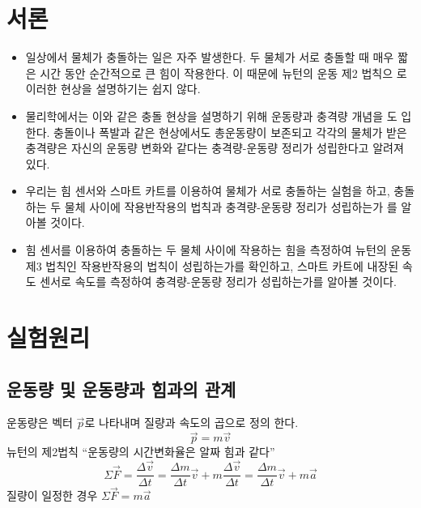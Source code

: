 \documentclass[12pt,a4paper]{article}
\begin{document}
\section{서론}
\begin{itemize}
    \item 일상에서 물체가 충돌하는 일은 자주 발생한다. 두 물체가 서로 충돌할 때 매우
        짧은 시간 동안 순간적으로 큰 힘이 작용한다. 이 때문에 뉴턴의 운동 제2 법칙으
        로 이러한 현상을 설명하기는 쉽지 않다.
    \item 물리학에서는 이와 같은 충돌 현상을 설명하기 위해 운동량과 충격량 개념을 도
        입한다. 충돌이나 폭발과 같은 현상에서도 총운동량이 보존되고 각각의 물체가
        받은 충격량은 자신의 운동량 변화와 같다는 충격량-운동량 정리가 성립한다고
        알려져 있다.
    \item 우리는 힘 센서와 스마트 카트를 이용하여 물체가 서로 충돌하는 실험을 하고,
        충돌하는 두 물체 사이에 작용반작용의 법칙과 충격량-운동량 정리가 성립하는가
        를 알아볼 것이다.
    \item 힘 센서를 이용하여 충돌하는 두 물체 사이에 작용하는 힘을 측정하여 뉴턴의
        운동 제3 법칙인 작용반작용의 법칙이 성립하는가를 확인하고, 스마트 카트에
        내장된 속도 센서로 속도를 측정하여 충격량-운동량 정리가 성립하는가를 알아볼
        것이다.
\end{itemize}
\section{실험원리}
\subsection{운동량 및 운동량과 힘과의 관계}
운동량은 벡터 $\vec{p}$로 나타내며 질량과 속도의 곱으로 정의 한다.
$$\vec{p}=m\vec{v}$$
뉴턴의 제2법칙 “운동량의 시간변화율은 알짜 힘과 같다”
$$\Sigma\vec{F}=\frac{\Delta\vec{v}}{\Delta t} =
    \frac{\Delta m}{\Delta t}\vec{v}+m\frac{\Delta\vec{v}}{\Delta t} = 
    \frac{\Delta m}{\Delta t}\vec{v}+m\vec{a}$$
질량이 일정한 경우 $\Sigma\vec{F}=m\vec{a}$
\end{document}
